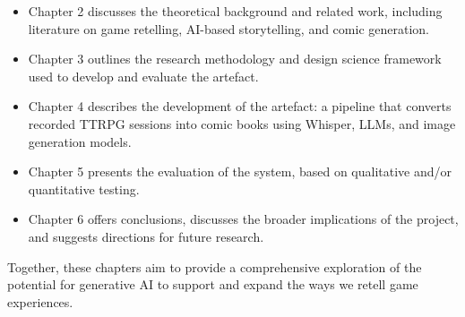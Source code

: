 \begin{itemize}
    \item Chapter 2 discusses the theoretical background and related work, including literature on game retelling, AI-based storytelling, and comic generation.
    \item Chapter 3 outlines the research methodology and design science framework used to develop and evaluate the artefact.
    \item Chapter 4 describes the development of the artefact: a pipeline that converts recorded TTRPG sessions into comic books using Whisper, LLMs, and image generation models.
    \item Chapter 5 presents the evaluation of the system, based on qualitative and/or quantitative testing.
    \item Chapter 6 offers conclusions, discusses the broader implications of the project, and suggests directions for future research.
\end{itemize}

Together, these chapters aim to provide a comprehensive exploration of the potential for generative AI to support and expand the ways we retell game experiences.
